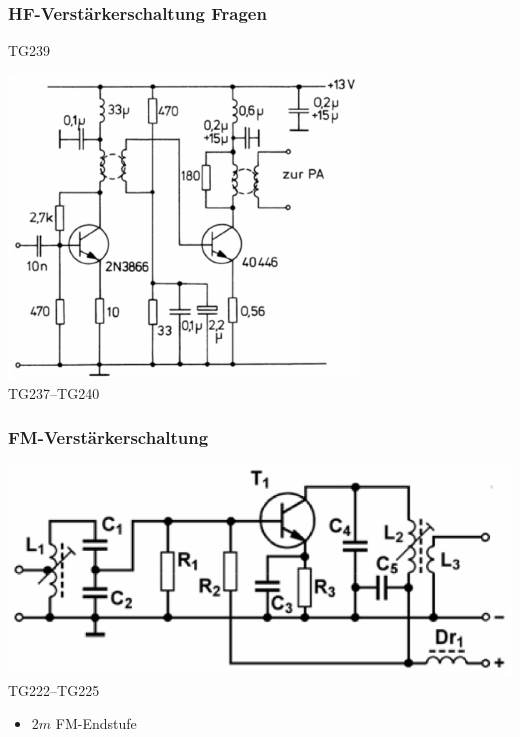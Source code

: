 \begin{frame}
  \frametitle{HF-Verstärkerschaltung Fragen}
  \begin{center}
    \begin{exampleblock}{TG239}
    \end{exampleblock}
    \includegraphics[width=0.7\textwidth,height=.5\textheight,keepaspectratio]{a07/TG237.png}\\
    {\tiny TG237--TG240 \hyperlink{refs}{\cite{bna}}}
  \end{center}
\end{frame}

\begin{frame}
  \frametitle{FM-Verstärkerschaltung}
  \begin{center}
    \includegraphics[width=1\textwidth,height=.6\textheight,keepaspectratio]{a07/TG222.png}\\
    {\tiny TG222--TG225 \hyperlink{refs}{\cite{bna}}}
    \begin{itemize}
      \item $2m$ FM-Endstufe
    \end{itemize}
  \end{center}
\end{frame}

